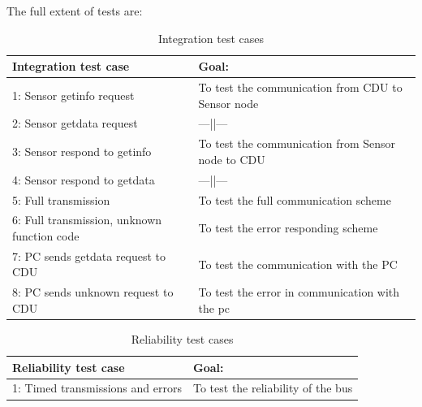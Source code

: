 The full extent of tests are:\\
\begin{table}[H]
	\centering
    \begin{tabular}{|p{6.5cm}|p{7.5cm}|}
    \hline
    Integration test case                       & Goal: \\ \hline
    1: Sensor getinfo request                   & To test the communication from CDU to Sensor node\\ \hline
    2: Sensor getdata request                   & ---||--- \\ \hline
    3: Sensor respond to getinfo                & To test the communication from Sensor node to CDU\\ \hline
    4: Sensor respond to getdata                & ---||--- \\ \hline
    5: Full transmission                        & To test the full communication scheme     \\ \hline
    6: Full transmission, unknown function code & To test the error responding scheme     \\ \hline 
    7: PC sends getdata request to CDU          & To test the communication with the PC     \\ \hline
    8: PC sends unknown request to CDU          & To test the error in communication with the pc\\ \hline
    \end{tabular}
    \caption{Integration test cases}
    \label{tab:intetestcas}
\end{table}
\begin{table}[H]
	\centering
    \begin{tabular}{|p{6.5cm}|p{7.5cm}|}
    \hline
    Reliability test case                             & Goal: \\ \hline
    1: Timed transmissions and errors                 & To test the reliability of the bus \\ \hline
    \end{tabular}
    \caption{Reliability test cases}
    \label{tab:reliability}
\end{table}
